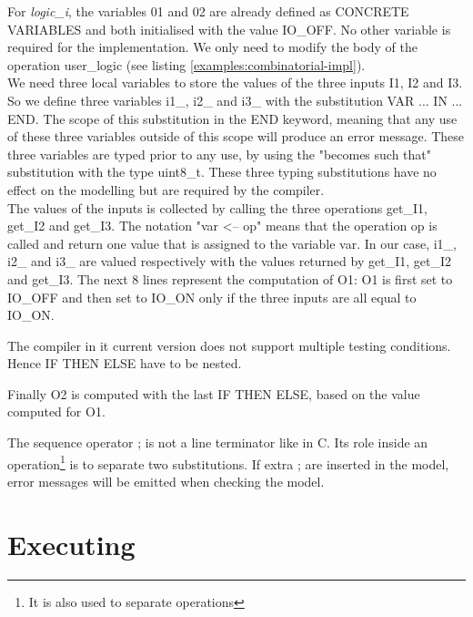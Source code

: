 

For \textit{logic\_i}, the variables 01 and 02 are already defined as CONCRETE\\VARIABLES and both initialised with the value IO\_OFF. No other variable is required for the implementation. We only need to modify the body of the operation user\_logic (see listing \ref{examples:combinatorial-impl}). \\
We need three local variables to store the values of the three inputs I1, I2 and I3. So we define three variables i1\_, i2\_ and i3\_ with the substitution VAR ... IN ... END. The scope of this substitution in the END keyword, meaning that any use of these three variables outside of this scope will produce an error message. These three variables are typed prior to any use, by using the "becomes such that" substitution with the type uint8\_t. These three typing substitutions have no effect on the modelling but are required by the compiler.\\
The values of the inputs is collected by calling the three operations get\_I1, get\_I2 and get\_I3. The notation "var <-- op" means that the operation op is called and return one value that is assigned to the variable var. In our case, i1\_, i2\_ and i3\_ are valued respectively with the values returned by get\_I1, get\_I2 and get\_I3.
The next 8 lines represent the computation of O1: O1 is first set to IO\_OFF and then set to IO\_ON only if the three inputs are all equal to IO\_ON. 
\begin{remark}
The compiler in it current version does not support multiple testing conditions. Hence IF THEN ELSE have to be nested. 
\end{remark}
Finally O2 is computed with the last IF THEN ELSE, based on the value computed for O1.
\begin{remark}
The sequence operator ; is not a line terminator like in C. Its role inside an operation\footnote{It is also used to separate operations} is to separate two substitutions. If extra ; are inserted in the model, error messages will be emitted when checking the model. 
\end{remark}

\section{Executing}

